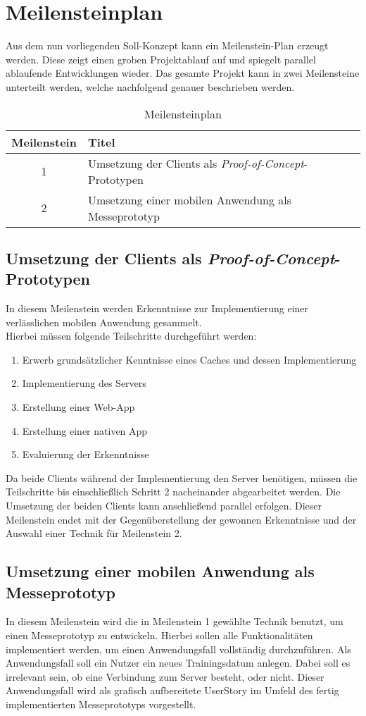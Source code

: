 \section{Meilensteinplan}
\label{sec:meilenstein-plan}
Aus dem nun vorliegenden Soll-Konzept kann ein Meilenstein-Plan erzeugt werden. Diese zeigt einen groben Projektablauf auf und spiegelt parallel ablaufende Entwicklungen wieder. Das gesamte Projekt kann in zwei Meilensteine unterteilt werden, welche nachfolgend genauer beschrieben werden.
\begin{table}[!h]
\centering
\caption{Meilensteinplan}
\label{tbl:meilensteinplan}
\begin{tabular}{|c|l|}
\hline
{\bf Meilenstein} & {\bf Titel}                                                      \\ \hline
1                 & Umsetzung der Clients als \textit{Proof-of-Concept}-Prototypen \\ \hline
2                 & Umsetzung einer mobilen Anwendung als Messeprototyp              \\ \hline
\end{tabular}
\end{table}

\subsection{Umsetzung der Clients als \textit{Proof-of-Concept}-Prototypen}
In diesem Meilenstein werden Erkenntnisse zur Implementierung einer verlässlichen mobilen Anwendung gesammelt. \\
Hierbei müssen folgende Teilschritte durchgeführt werden:
\begin{enumerate}
\item Erwerb grundsätzlicher Kenntnisse eines Caches und dessen Implementierung
\item Implementierung des Servers 
\item Erstellung einer \ac{Web-App}
\item Erstellung einer nativen \gls{App}
\item Evaluierung der Erkenntnisse
\end{enumerate}
Da beide Clients während der Implementierung den Server benötigen, müssen die Teilschritte bis einschließlich Schritt 2 nacheinander abgearbeitet werden. Die Umsetzung der beiden Clients kann anschließend parallel erfolgen. Dieser Meilenstein endet mit der Gegenüberstellung der gewonnen Erkenntnisse und der Auswahl einer Technik für Meilenstein 2.
\subsection{Umsetzung einer mobilen Anwendung als Messeprototyp}
In diesem Meilenstein wird die in Meilenstein 1 gewählte Technik benutzt, um einen Messeprototyp zu entwickeln. Hierbei sollen alle Funktionalitäten implementiert werden, um einen Anwendungsfall vollständig durchzuführen. Als Anwendungsfall soll ein Nutzer ein neues Trainingsdatum anlegen. Dabei soll es irrelevant sein, ob eine Verbindung zum Server besteht, oder nicht. Dieser Anwendungsfall wird als grafisch aufbereitete \gls{UserStory} im Umfeld des fertig implementierten Messeprototyps vorgestellt.